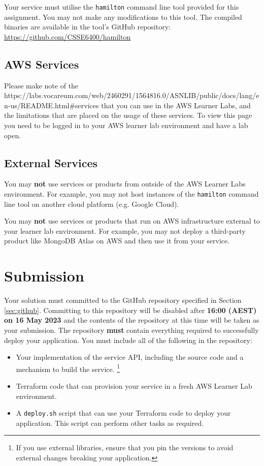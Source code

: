 \documentclass{csse4400}
\begin{document}
Your service must utilise the \texttt{hamilton} command line tool provided for this assignment.
You may not make any modifications to this tool.
The compiled binaries are available in the tool's GitHub repository:
\url{https://github.com/CSSE6400/hamilton}

\subsection{AWS Services}
Please make note of the 
{https://labs.vocareum.com/web/2460291/1564816.0/ASNLIB/public/docs/lang/en-us/README.html\#services}
that you can use in the AWS Learner Labs, and the limitations that are placed on the usage of these services.
To view this page you need to be logged in to your AWS learner lab environment and have a lab open.

\subsection{External Services}
You may \textbf{not} use services or products from outside of the AWS Learner Labs environment.
For example, you may not host instances of the \texttt{hamilton} command line tool on another cloud platform
(e.g. Google Cloud).

You may \textbf{not} use services or products that run on AWS infrastructure external to your learner lab environment.
For example, you may not deploy a third-party product like MongoDB Atlas on AWS and then use it from your service.

\section{Submission}
Your solution must committed to the GitHub repository specified in Section \ref{sec:github}.
Committing to this repository will be disabled after \textbf{16:00 (AEST) on 16 May 2023} and the contents of the repository at this time will be taken as your submission.
The repository \textbf{must} contain everything required to successfully deploy your application.
You must include all of the following in the repository:
\begin{itemize}
  \item Your implementation of the service API, including the source code and a mechanism to build the service.%
  \footnote{If you use external libraries, ensure that you pin the versions to avoid external changes breaking your application.}
  \item Terraform code that can provision your service in a fresh AWS Learner Lab environment.
  \item A \texttt{deploy.sh} script that can use your Terraform code to deploy your application.
    This script can perform other tasks as required.
\end{itemize}
\end{document}
